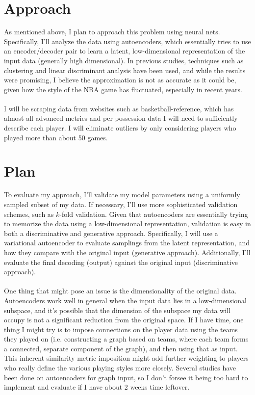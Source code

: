 \documentclass[12pt]{article}
\begin{document}
    \section{Approach}
    As mentioned above, I plan to approach this problem using neural nets. Specifically, I'll analyze the data using autoencoders, which essentially tries to use an encoder/decoder pair to learn a latent, low-dimensional representation of the input data (generally high dimensional). In previous studies, techniques such as clustering and linear discriminant analysis have been used, and while the results were promising, I believe the approximation is not as accurate as it could be, given how the style of the NBA game has fluctuated, especially in recent years.
    \\ \\
    I will be scraping data from websites such as basketball-reference, which has almost all advanced metrics and per-possession data I will need to sufficiently describe each player. I will eliminate outliers by only considering players who played more than about 50 games.
    \section{Plan}
    To evaluate my approach, I'll validate my model parameters using a uniformly sampled subset of my data. If necessary, I'll use more sophisticated validation schemes, such as $k$-fold validation. Given that autoencoders are essentially trying to memorize the data using a low-dimensional representation, validation is easy in both a discriminative and generative approach. Specifically, I will use a variational autoencoder to evaluate samplings from the latent representation, and how they compare with the original input (generative approach). Additionally, I'll evaluate the final decoding (output) against the original input (discriminative approach).
    \\ \\
    One thing that might pose an issue is the dimensionality of the original data. Autoencoders work well in general when the input data lies in a low-dimensional subspace, and it's possible that the dimension of the subspace my data will occupy is not a significant reduction from the original space. If I have time, one thing I might try is to impose connections on the player data using the teams they played on (i.e. constructing a graph based on teams, where each team forms a connected, separate component of the graph), and then using that as input. This inherent similarity metric imposition might add further weighting to players who really define the various playing styles more closely. Several studies have been done on autoencoders for graph input, so I don't forsee it being too hard to implement and evaluate if I have about 2 weeks time leftover.
\end{document}
